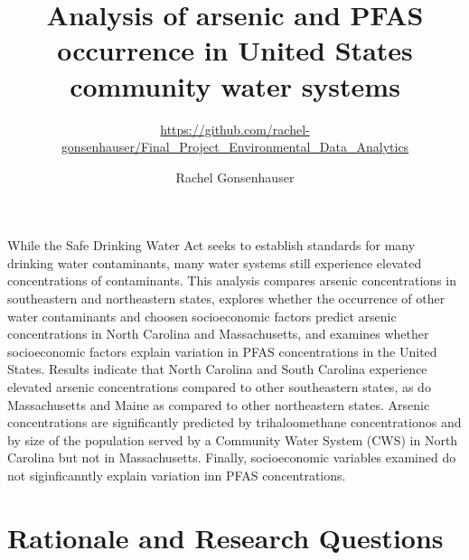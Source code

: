 \documentclass[12pt,]{article}
\title{Analysis of arsenic and PFAS occurrence in United States community water
systems}
\subtitle{\url{https://github.com/rachel-gonsenhauser/Final_Project_Environmental_Data_Analytics}}
\author{Rachel Gonsenhauser}
\date{}
\begin{document}
\maketitle

\newpage
\abstract

While the Safe Drinking Water Act seeks to establish standards for many
drinking water contaminants, many water systems still experience
elevated concentrations of contaminants. This analysis compares arsenic
concentrations in southeastern and northeastern states, explores whether
the occurrence of other water contaminants and choosen socioeconomic
factors predict arsenic concentrations in North Carolina and
Massachusetts, and examines whether socioeconomic factors explain
variation in PFAS concentrations in the United States. Results indicate
that North Carolina and South Carolina experience elevated arsenic
concentrations compared to other southeastern states, as do
Massachusetts and Maine as compared to other northeastern states.
Arsenic concentrations are significantly predicted by trihaloomethane
concentrationos and by size of the population served by a Community
Water System (CWS) in North Carolina but not in Massachusetts. Finally,
socioeconomic variables examined do not siginficanntly explain variation
inn PFAS concentrations.

\newpage
\tableofcontents 
\newpage
\listoftables 
\newpage
\listoffigures 
\newpage

\hypertarget{rationale-and-research-questions}{%
\section{Rationale and Research
Questions}\label{rationale-and-research-questions}}
\end{document}
